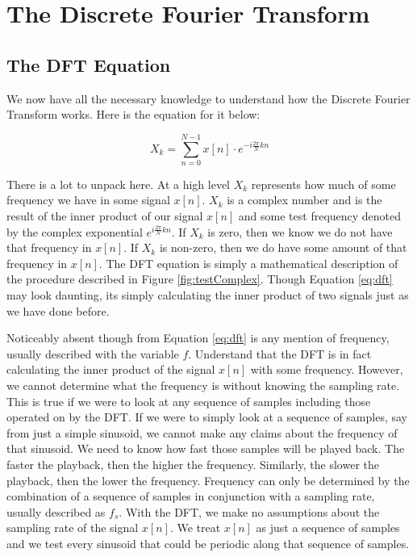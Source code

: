 \section*{The Discrete Fourier Transform}

\subsection*{The DFT Equation}

We now have all the necessary knowledge to understand how the Discrete Fourier Transform works.  Here is the
equation for it below:

\begin{equation}
\label{eq:dft}
X_k = \sum_{n = 0}^{N - 1}x[n] \cdot e^{-i\frac{2\pi}{N}kn}
\end{equation}

There is a lot to unpack here.  At a high level $X_k$ represents how much of some frequency we have in
some signal $x[n]$.  $X_k$ is a complex number and is the result of the inner product of our signal $x[n]$
and some test frequency denoted by the complex exponential $e^{i\frac{2\pi}{N}kn}$.  If $X_k$ is zero, then
we know we do not have that frequency in $x[n]$.  If $X_k$ is non-zero, then we do have some amount of 
that frequency in $x[n]$.  The DFT equation is simply a mathematical description of the procedure described 
in Figure \ref{fig:testComplex}.  Though Equation \ref{eq:dft} may look daunting, its simply calculating the
inner product of two signals just as we have done before.

Noticeably absent though from Equation \ref{eq:dft} is any mention of frequency, usually described with the
variable $f$.  Understand that the DFT is in fact calculating the inner product of the signal $x[n]$ with some
 frequency.  However, we cannot determine what the frequency is without knowing the sampling rate.  This is
 true if we were to look at any sequence of samples including those operated on by the DFT.
If we were to simply look at a sequence of samples, say from just a simple sinusoid, we cannot make any
claims about the frequency of that sinusoid.  We need to know how fast those samples will be played back.  
 The faster the playback, then the higher the frequency.  Similarly, the slower the playback, then the lower
 the frequency.  Frequency can only be determined by the combination 
 of a sequence of samples in conjunction with a sampling rate, usually described as $f_s$.  With the DFT, we
 make no assumptions about the sampling rate of the signal $x[n]$.  We treat $x[n]$ as just a sequence of
 samples and we test every sinusoid that could be periodic along that sequence of samples.

